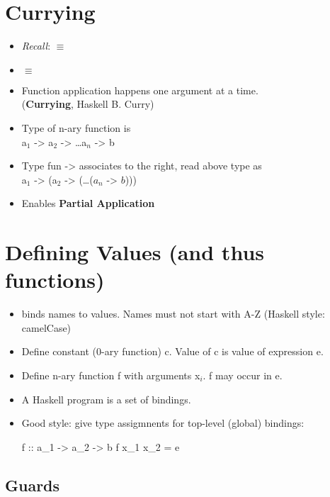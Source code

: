 \section{Currying}

\begin{itemize}
  \item \textit{Recall}:  $\equiv$ 
  \item {} $\equiv$ 
  \item Function application happens one argument at a time. \\ (\textbf{Currying}, Haskell B. Curry)
  \item Type of n-ary function is \\ a$_1$ -> a$_2$ -> \dots a$_n$ -> b
  \item Type fun -> associates to the right, read above type as \\ a$_1$ -> (a$_2$ -> (\dots ($a_n$ -> $b$)))
  \item Enables \textbf{Partial Application}
\end{itemize}


\section{Defining Values (and thus functions)}

\begin{itemize}
  \item \codeline{=} binds names to values. Names must not start with A-Z (Haskell style: camelCase)
  \item Define constant (0-ary function) c. Value of c is value of expression e. \\ 
  \item Define n-ary function f with arguments x$_i$. f may occur in e. \\ 
  \item A Haskell program is a set of bindings.
  \item Good style: give type assigmnents for top-level (global) bindings: 
  \begin{codebox}[haskell]
f :: a_1 -> a_2 -> b
f x_1 x_2 = e
  \end{codebox}
\end{itemize}

\subsection{Guards}

